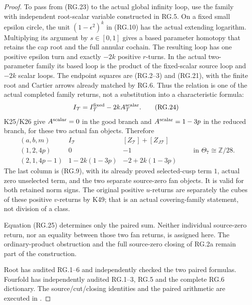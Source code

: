 \begin{proof}
To pass from (RG.23) to the actual global infinity loop,
use the family with independent root-scalar variable
constructed in RG.5. On a fixed small epsilon circle,
the unit \((1-\epsilon^2)^k\) in (RG.10) has the actual
extending logarithm. Multiplying its argument by
\(s\in[0,1]\) gives a based parameter homotopy that
retains the cap root and the full annular cochain.
The resulting loop has one positive epsilon turn and
exactly \(-2k\) positive \(r\)-turns. In the actual
two-parameter family its based loop is the product of
the fixed-scalar source loop and \(-2k\) scalar loops.
The endpoint squares are (RG.2--3) and (RG.21), with
the finite root and Cartier arrows already matched
by RG.6. Thus the relation is one of the actual
completed family returns, not a substitution into a
characteristic formula:
\[
             I_{\mathcal T}
                  =I^{\rm fixed}_{\mathcal T}
                         -2kA^{\rm scalar}_{\mathcal T}.
                                                        \tag{RG.24}
\]
K25/K26 give \(A^{\rm scalar}=0\) in the good branch
and \(A^{\rm scalar}=1-3p\) in the reduced branch,
for these two actual fan objects. Therefore
\[
 \begin{array}{c|c|c}
 (a,b,m)&I_{\mathcal T}
                 &[Z_{\mathcal T}]+[Z_{J\mathcal T}]\\ \hline
 (1,2,4p)&0&-1\\
 (2,1,4p-1)&1-2k(1-3p)&-2+2k(1-3p)
 \end{array}
 \qquad\text{in }\Theta_7\cong\mathbb Z/28.             \tag{RG.25}
\]
The last column is (RG.9), with its already proved
selected-cusp term \(1\), actual zero unselected
term, and the two separate source-zero fan objects.
It is valid for both retained norm signs. The original
positive \(u\)-returns are separately the cubes of
these positive \(v\)-returns by K49; that is an actual
covering-family statement, not division of a class.

Equation (RG.25) determines only the paired sum.
Neither individual source-zero return, nor an equality
between those two fan returns, is assigned here.
The ordinary-product obstruction and the full
source-zero closing of RG.2a remain part of the
construction.

Root has audited RG.1--6 and independently checked
the two paired formulas. Fourfold has independently
audited RG.1--3, RG.5 and the complete RG.6 dictionary.
The source/cut/closing identities and the paired
arithmetic are executed in
.
\end{proof}
